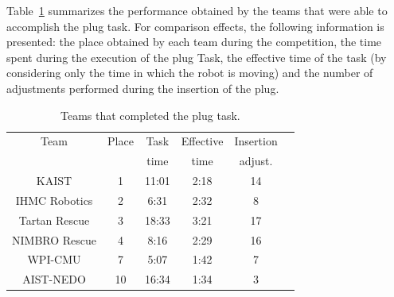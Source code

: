 		Table~\ref{tab:teams} summarizes the performance obtained by the teams that were able to
		accomplish the plug task.
		For comparison effects, the following information is presented:
		the place obtained by each team during the competition, the time spent during the execution
		of the plug Task, the effective time of the task (by considering only the time in which the
		robot is moving) and the number of adjustments performed during the insertion of the plug.
		
		\begin{table}[t]
			\caption{Teams that completed the plug task.}
			\label{tab:teams}
			\centering
			\begin{tabular}{cccccc}
				\hline
				Team 					& Place	& Task	& Effective & Insertion	\\
											& 			& time	& time			& adjust.		\\
				\hline
				KAIST					& 1			& 11:01	& 2:18			& 14				\\
				IHMC Robotics	& 2			& 6:31	& 2:32			& 8					\\
				Tartan Rescue	& 3			& 18:33	& 3:21			& 17				\\
				NIMBRO Rescue	& 4			& 8:16	& 2:29			& 16				\\
				WPI-CMU				& 7			& 5:07	& 1:42			& 7					\\
				AIST-NEDO			& 10		& 16:34	& 1:34			& 3					\\
				\hline
			\end{tabular}
		\end{table}